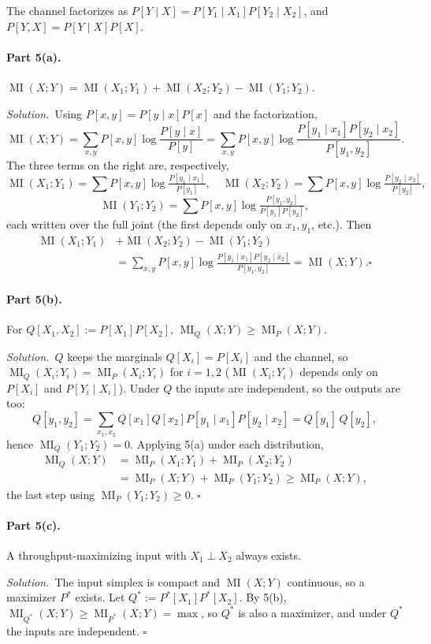 \documentclass[11pt]{article}
\DeclareMathOperator{\MI}{MI}
\newcommand{\soln}{\medskip\noindent\textit{Solution.}\ }
\renewcommand{\qed}{\ensuremath{\square}}
\begin{document}
\begin{solution}
The channel factorizes as $P[Y\mid X]=P[Y_1\mid X_1]P[Y_2\mid X_2]$, and $P[Y,X]=P[Y\mid X]P[X]$.

\paragraph{Part 5(a).} $\MI(X;Y)=\MI(X_1;Y_1)+\MI(X_2;Y_2)-\MI(Y_1;Y_2)$.

\soln Using $P[x,y]=P[y\mid x]P[x]$ and the factorization,
\[
  \MI(X;Y)=\sum_{x,y}P[x,y]\log\frac{P[y\mid x]}{P[y]}
  =\sum_{x,y}P[x,y]\log\frac{P[y_1\mid x_1]P[y_2\mid x_2]}{P[y_1,y_2]}.
\]
The three terms on the right are, respectively,
\[
  \MI(X_1;Y_1)=\sum P[x,y]\log\tfrac{P[y_1\mid x_1]}{P[y_1]},\quad
  \MI(X_2;Y_2)=\sum P[x,y]\log\tfrac{P[y_2\mid x_2]}{P[y_2]},
\]
\[
  \MI(Y_1;Y_2)=\sum P[x,y]\log\tfrac{P[y_1,y_2]}{P[y_1]P[y_2]},
\]
each written over the full joint (the first depends only on $x_1,y_1$, etc.). Then
\begin{align*}
  \MI(X_1;Y_1)&+\MI(X_2;Y_2)-\MI(Y_1;Y_2)\\
  &=\sum_{x,y}P[x,y]\log\frac{P[y_1\mid x_1]P[y_2\mid x_2]}{P[y_1,y_2]} =\MI(X;Y). \qed
\end{align*}

\paragraph{Part 5(b).} For $Q[X_1,X_2]:=P[X_1]P[X_2]$, $\MI_Q(X;Y)\ge\MI_P(X;Y)$.

\soln $Q$ keeps the marginals $Q[X_i]=P[X_i]$ and the channel, so $\MI_Q(X_i;Y_i)=\MI_P(X_i;Y_i)$ for $i=1,2$ ($\MI(X_i;Y_i)$ depends only on $P[X_i]$ and $P[Y_i\mid X_i]$). Under $Q$ the inputs are independent, so the outputs are too:
\[
  Q[y_1,y_2]=\sum_{x_1,x_2}Q[x_1]Q[x_2]P[y_1\mid x_1]P[y_2\mid x_2]=Q[y_1]\,Q[y_2],
\]
hence $\MI_Q(Y_1;Y_2)=0$. Applying 5(a) under each distribution,
\begin{align*}
  \MI_Q(X;Y)&=\MI_P(X_1;Y_1)+\MI_P(X_2;Y_2)\\
  &=\MI_P(X;Y)+\MI_P(Y_1;Y_2)\ge\MI_P(X;Y),
\end{align*}
the last step using $\MI_P(Y_1;Y_2)\ge0$. \qed

\paragraph{Part 5(c).} A throughput-maximizing input with $X_1\perp X_2$ always exists.

\soln The input simplex is compact and $\MI(X;Y)$ continuous, so a maximizer $P^*$ exists. Let $Q^*:=P^*[X_1]P^*[X_2]$. By 5(b), $\MI_{Q^*}(X;Y)\ge\MI_{P^*}(X;Y)=\max$, so $Q^*$ is also a maximizer, and under $Q^*$ the inputs are independent. \qed
\end{solution}
\end{document}
